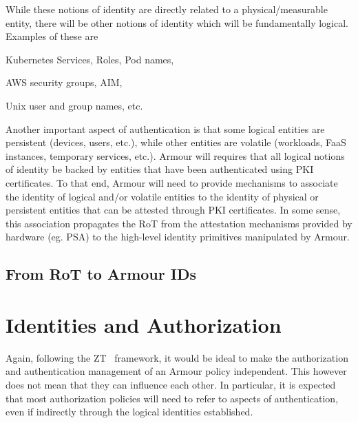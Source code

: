 \documentclass[a4paper]{article}
\newcommand{\armour}{{\sc Armour}}
\newcommand{\ZT}{{\sc ZT}}
\newcommand{\rot}{RoT}
\newcommand{\psa}{PSA}
\begin{document}
While these notions of identity are directly related to a
physical/measurable entity, there will be other notions of identity
which will be fundamentally logical.
%
Examples of these are
\begin{inparaitem}[-]
\item Kubernetes Services, Roles, Pod names, 
\item AWS security groups, AIM,
\item Unix user and group names, etc.
\end{inparaitem}
%

Another important aspect of authentication is that some logical
entities are persistent (devices, users, etc.), while other entities
are volatile (workloads, FaaS instances, temporary services, etc.).
%
\armour{} will requires that all logical notions of identity be
backed by entities that have been authenticated using PKI
certificates. 
%
To that end, \armour{} will need to provide mechanisms to associate
the identity of logical and/or volatile entities to the identity of
physical or persistent entities that can be attested through PKI
certificates.
%
In some sense, this association propagates the \rot{} from the
attestation mechanisms provided by hardware (eg. \psa{}) to the
high-level identity primitives manipulated by \armour{}.

\subsection{From \rot{} to \armour{} IDs}
\label{sec:from-rot-armour}


\section{Identities and Authorization}

Again, following the \ZT{}~\cite{GilmanB17} framework, it would be
ideal to make the authorization and authentication management of an
\armour{} policy independent.
%
This however does not mean that they can influence each other.
%
In particular, it is expected that most authorization policies will
need to refer to aspects of authentication, even if indirectly through
the logical identities established.
\end{document}
